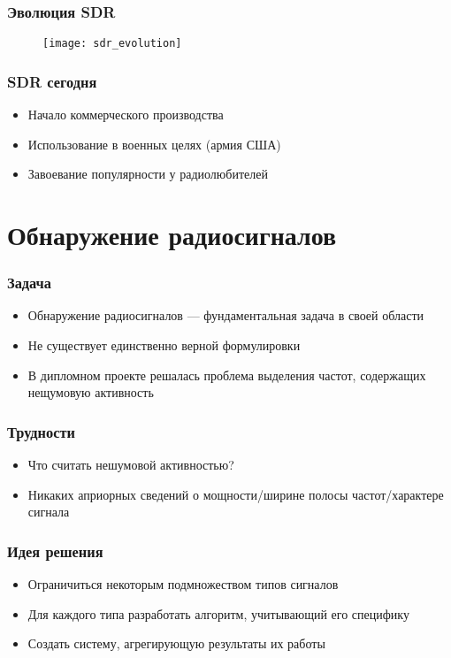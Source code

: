 \documentclass[14pt,russian]{beamer}
\begin{document}
\begin{frame}
  \frametitle{Эволюция SDR}
  \begin{figure}
    \texttt{[image: sdr\_evolution]}
  \end{figure}
\end{frame}

\begin{frame}
  \frametitle{SDR сегодня}
  \begin{itemize}
    \item{Начало коммерческого производства}
    \item{Использование в военных целях (армия США)}
    \item{Завоевание популярности у радиолюбителей}
  \end{itemize}
\end{frame}


\section{Обнаружение радиосигналов}

\begin{frame}
  \frametitle{Задача}
  \begin{itemize}
    \item{Обнаружение радиосигналов --- фундаментальная задача в своей области}
    \item{Не существует единственно верной формулировки}
    \item{В дипломном проекте решалась проблема выделения частот, содержащих нещумовую активность}
  \end{itemize}
\end{frame}

\begin{frame}
  \frametitle{Трудности}
  \begin{itemize}
    \item{Что считать нешумовой активностью?}
    \item{Никаких априорных сведений о мощности/ширине полосы частот/характере сигнала}
  \end{itemize}
\end{frame}

\begin{frame}
  \frametitle{Идея решения}
  \begin{itemize}
    \item{Ограничиться некоторым подмножеством типов сигналов}
    \item{Для каждого типа разработать алгоритм, учитывающий его специфику}
    \item{Создать систему, агрегирующую результаты их работы}
  \end{itemize}
\end{frame}
\end{document}
